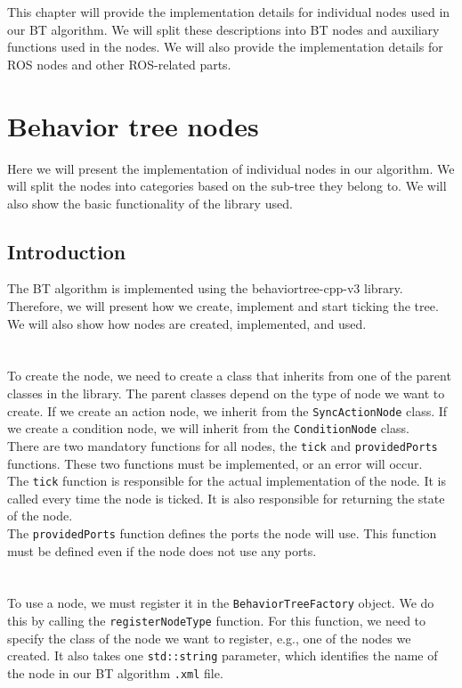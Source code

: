 This chapter will provide the implementation details for individual nodes used in our BT algorithm. We will split these descriptions into BT nodes and auxiliary functions used in the nodes. We will also provide the implementation details for ROS nodes and other ROS-related parts.

\section{Behavior tree nodes}
    Here we will present the implementation of individual nodes in our algorithm. We will split the nodes into categories based on the sub-tree they belong to. We will also show the basic functionality of the library used.
    \subsection{Introduction}
        The BT algorithm is implemented using the behaviortree-cpp-v3 library. Therefore, we will present how we create, implement and start ticking the tree. We will also show how nodes are created, implemented, and used.\\\\
        \\
            To create the node, we need to create a class that inherits from one of the parent classes in the library. The parent classes depend on the type of node we want to create. If we create an action node, we inherit from the \texttt{SyncActionNode} class. If we create a condition node, we will inherit from the \texttt{ConditionNode} class.\\
            There are two mandatory functions for all nodes, the \texttt{tick} and \texttt{providedPorts} functions. These two functions must be implemented, or an error will occur.\\
            The \texttt{tick} function is responsible for the actual implementation of the node. It is called every time the node is ticked. It is also responsible for returning the state of the node.\\
            The \texttt{providedPorts} function defines the ports the node will use. This function must be defined even if the node does not use any ports.\\\\
        \\
            To use a node, we must register it in the \texttt{BehaviorTreeFactory} object. We do this by calling the \texttt{registerNodeType} function. For this function, we need to specify the class of the node we want to register, e.g., one of the nodes we created. It also takes one \texttt{std::string} parameter, which identifies the name of the node in our BT algorithm \texttt{.xml} file.\\\\
